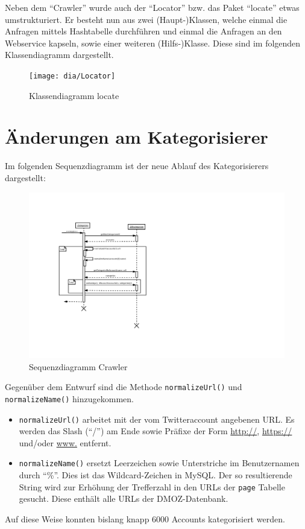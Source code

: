 Neben dem "`Crawler"' wurde auch der "`Locator"' bzw. das Paket "`locate"' etwas umstrukturiert. Er besteht nun aus zwei (Haupt-)Klassen, welche einmal die Anfragen mittels Hashtabelle durchführen und einmal die Anfragen an den Webservice kapseln, sowie einer weiteren (Hilfs-)Klasse. Diese sind im folgenden Klassendiagramm dargestellt.
 \begin{figure}[H]
 	\centering
 	\texttt{[image: dia/Locator]}
 	\caption{Klassendiagramm locate}
 	\label{fig:locate}
 \end{figure}

\section{Änderungen am Kategorisierer}
Im folgenden Sequenzdiagramm ist der neue Ablauf des Kategorisierers dargestellt:
\begin{figure}[H]
	\centering
	\includegraphics[width=\textwidth,height=\textheight,keepaspectratio=true]{dia/categorizerSequence}
	\caption{Sequenzdiagramm Crawler}
	\label{fig:Crawler}
\end{figure}
Gegenüber dem Entwurf sind die Methode \lstinline{normalizeUrl()} und \lstinline{normalizeName()} hinzugekommen.
\begin{itemize}
	\item \lstinline{normalizeUrl()} arbeitet mit der vom Twitteraccount angebenen URL. Es werden das Slash ("`/"') am Ende sowie Präfixe der Form \url{http://}, \url{https://} und/oder \url{www.} entfernt.
	\item \lstinline{normalizeName()} ersetzt Leerzeichen sowie Unterstriche im Benutzernamen durch "`\%"'. Dies ist das Wildcard-Zeichen in MySQL. Der so resultierende String wird zur Erhöhung der Trefferzahl in den URLs der \lstinline{page} Tabelle gesucht. Diese enthält alle URLs der DMOZ-Datenbank.
\end{itemize}
Auf diese Weise konnten bislang knapp 6000 Accounts kategorisiert werden.

